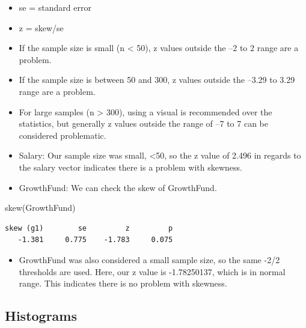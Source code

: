 \documentclass[
  letterpaper,
  DIV=11,
  numbers=noendperiod]{scrreprt}
\newenvironment{Shaded}{\begin{snugshade}}{\end{snugshade}}
\newcommand{\FunctionTok}[1]{\textcolor[rgb]{0.28,0.35,0.67}{#1}}
\newcommand{\NormalTok}[1]{\textcolor[rgb]{0.00,0.23,0.31}{#1}}
\providecommand{\tightlist}{%
  \setlength{\itemsep}{0pt}\setlength{\parskip}{0pt}}\usepackage{longtable,booktabs,array}
\begin{document}
\begin{itemize}
\item
  se = standard error
\item
  z = skew/se
\item
  If the sample size is small (n \textless{} 50), z values outside the
  --2 to 2 range are a problem.
\item
  If the sample size is between 50 and 300, z values outside the --3.29
  to 3.29 range are a problem.
\item
  For large samples (n \textgreater{} 300), using a visual is
  recommended over the statistics, but generally z values outside the
  range of --7 to 7 can be considered problematic.
\item
  Salary: Our sample size was small, \textless50, so the z value of
  2.496 in regards to the salary vector indicates there is a problem
  with skewness.
\item
  GrowthFund: We can check the skew of GrowthFund.
\end{itemize}

\begin{Shaded}
\begin{Highlighting}[]
\FunctionTok{skew}\NormalTok{(GrowthFund)}
\end{Highlighting}
\end{Shaded}

\begin{verbatim}
skew (g1)        se         z         p 
   -1.381     0.775    -1.783     0.075 
\end{verbatim}

\begin{itemize}
\tightlist
\item
  GrowthFund was also considered a small sample size, so the same -2/2
  thresholds are used. Here, our z value is -1.78250137, which is in
  normal range. This indicates there is no problem with skewness.
\end{itemize}

\subsection{Histograms}\label{histograms}
\end{document}
